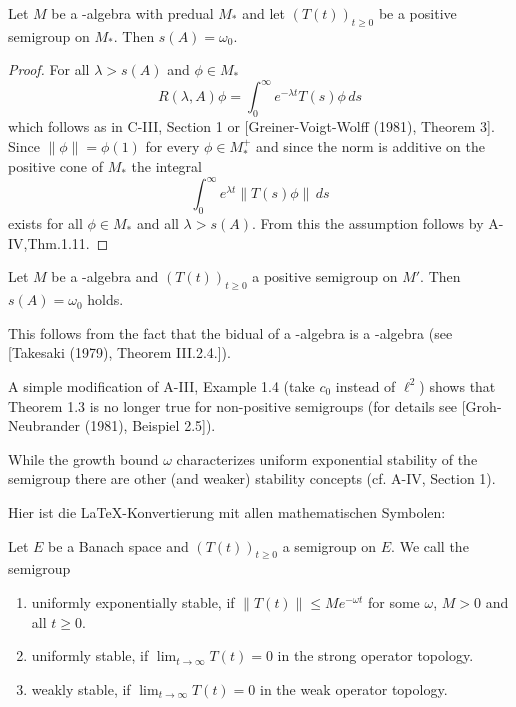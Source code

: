 \begin{theorem}\label{thm:1.3}
Let $M$ be a \WA-algebra with predual $M_{*}$ and let $(T(t))_{t \geq 0}$ be a positive semigroup on $M_{*}$.
Then $s(A) = \omega_{0}$.
\end{theorem}

\begin{proof}
For all $\lambda > s(A)$ and $\phi \in M_{*}$
\[
R(\lambda,A)\phi = \int_{0}^{\infty} e^{-\lambda t}T(s)\phi \, ds
\]
which follows as in C-III, Section 1 or [Greiner-Voigt-Wolff (1981), Theorem 3].
Since $\|\phi\| = \phi(1)$ for every $\phi \in M_{*}^{+}$ and since the norm is additive on the positive cone of $M_{*}$ the integral
\[
\int_{0}^{\infty} e^{\lambda t} \|T(s)\phi\| \, ds
\]
exists for all $\phi \in M_{*}$ and all $\lambda > s(A)$.
From this the assumption follows by A-IV,Thm.1.11.
\end{proof}

\begin{corollary}\label{cor:1.4}
Let $M$ be a \CA-algebra and $(T(t))_{t \geq 0}$ a positive semigroup on $M'$.
Then $s(A) = \omega_{0}$ holds.
\end{corollary}

This follows from the fact that the bidual of a \CA-algebra is a \WA-algebra (see [Takesaki (1979), Theorem III.2.4.]).

\begin{remark}\label{rem:1.5}
A simple modification of A-III, Example 1.4 (take $c_{0}$ instead of $\ell^2$) shows that Theorem 1.3 is no longer true for non-positive semigroups (for details see [Groh-Neubrander (1981), Beispiel 2.5]).

While the growth bound $\omega$ characterizes uniform exponential stability of the semigroup there are other (and weaker) stability concepts (cf. A-IV, Section 1).
\end{remark}


Hier ist die LaTeX-Konvertierung mit allen mathematischen Symbolen:

\begin{definition}\label{def:1.6}
Let $E$ be a Banach space and $(T(t))_{t\geq 0}$ a semigroup on $E$.
We call the semigroup
\begin{enumerate}[(1)]
\item
uniformly exponentially stable, if $\|T(t)\| \leq Me^{-\omega t}$ for some $\omega$, $M > 0$ and all $t \geq 0$.

\item
uniformly stable, if $\lim_{t \to \infty} T(t) = 0$ in the strong operator topology.

\item
weakly stable, if $\lim_{t \to \infty} T(t) = 0$ in the weak operator topology.
\end{enumerate}
\end{definition}

